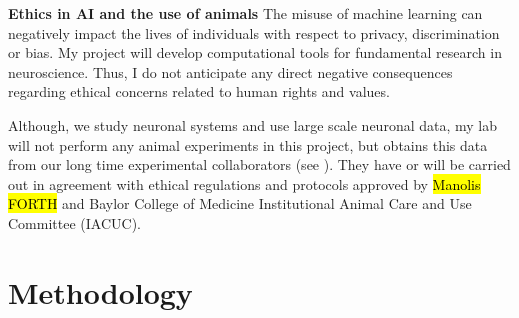 \documentclass[B2,COG]{ercgrant}
\begin{document}
\textbf{Ethics in AI and the use of animals}
The misuse of machine learning can negatively impact the lives of individuals with respect to privacy, discrimination or bias. 
My  project will develop computational tools for fundamental research in neuroscience. 
Thus, I do not anticipate any direct negative consequences regarding ethical concerns related to human rights and values.

Although, we study neuronal systems and use large scale neuronal data, my lab will not perform any animal experiments in this project, but obtains this data from our long time experimental collaborators (see ). 
They have or will be carried out in agreement with ethical regulations and protocols approved by \hl{Manolis FORTH} and Baylor College of Medicine Institutional Animal Care and Use Committee (IACUC).
\section{Methodology}
\end{document}
